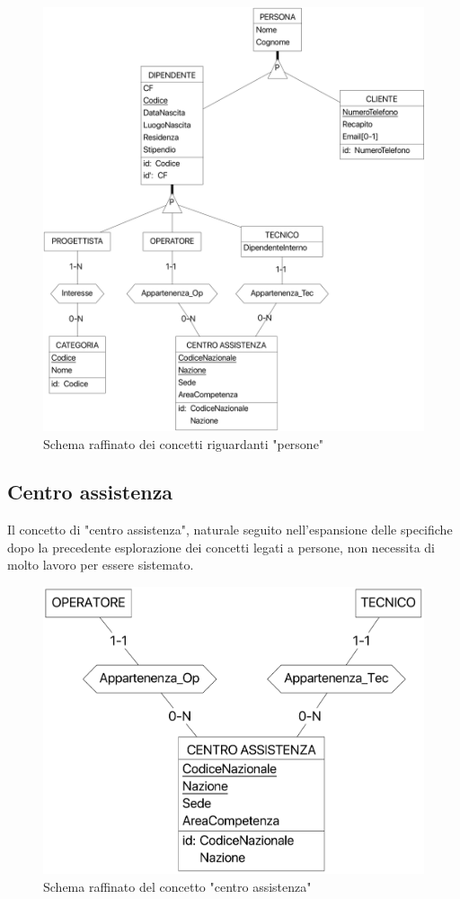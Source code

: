 \documentclass[a4paper, 12pt]{report}
\begin{document}
\begin{figure}[H]
	\centering
	\includegraphics[width=\linewidth]{images/persone.png}
	\caption{Schema raffinato dei concetti riguardanti "persone"}
\end{figure}

\subsection{Centro assistenza}

Il concetto di "centro assistenza", naturale seguito nell'espansione delle specifiche dopo la precedente esplorazione dei concetti legati a persone,
non necessita di molto lavoro per essere sistemato.  

\begin{figure}[H]
	\centering
	\includegraphics[width=\linewidth]{images/centriAssistenza.png}
	\caption{Schema raffinato del concetto "centro assistenza"}
\end{figure}
\end{document}
